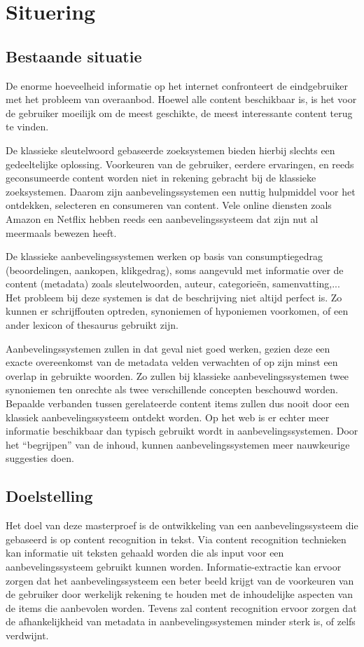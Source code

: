 \chapter{Situering}

\section{Bestaande situatie}
De enorme hoeveelheid informatie op het internet confronteert de eindgebruiker met het probleem van overaanbod.
Hoewel alle content beschikbaar is, is het voor de gebruiker moeilijk om de meest geschikte, de meest interessante
content terug te vinden. 

De klassieke sleutelwoord gebaseerde zoeksystemen bieden hierbij slechts een gedeeltelijke
oplossing. Voorkeuren van de gebruiker, eerdere ervaringen, en reeds geconsumeerde content worden niet in
rekening gebracht bij de klassieke zoeksystemen. Daarom zijn aanbevelingssystemen een nuttig hulpmiddel voor het
ontdekken, selecteren en consumeren van content. Vele online diensten zoals Amazon \cite{Everything2012} en Netflix \cite{Bennett2007} hebben
reeds een aanbevelingssysteem dat zijn nut al meermaals bewezen heeft. 

De klassieke aanbevelingssystemen werken op basis van consumptiegedrag (beoordelingen, aankopen, klikgedrag),
soms aangevuld met informatie over de content (metadata) zoals sleutelwoorden, auteur, categorie\"en, samenvatting,... Het probleem bij deze systemen is dat de beschrijving niet altijd perfect is. Zo kunnen er schrijffouten optreden, synoniemen of hyponiemen voorkomen, of een ander lexicon of thesaurus gebruikt zijn.

Aanbevelingssystemen zullen in dat geval niet goed werken, gezien deze een exacte overeenkomst van de metadata
velden verwachten of op zijn minst een overlap in gebruikte woorden. Zo zullen bij klassieke aanbevelingssystemen
twee synoniemen ten onrechte als twee verschillende concepten beschouwd worden. Bepaalde verbanden tussen
gerelateerde content items zullen dus nooit door een klassiek aanbevelingssysteem ontdekt worden.
Op het web is er echter meer informatie beschikbaar dan typisch gebruikt wordt in aanbevelingssystemen. Door het
“begrijpen” van de inhoud, kunnen aanbevelingssystemen meer nauwkeurige suggesties doen.

\section{Doelstelling}
Het doel van deze masterproef is de ontwikkeling van een aanbevelingssysteem die gebaseerd is op content
recognition in tekst. Via content recognition technieken kan informatie uit teksten gehaald worden die als input voor
een aanbevelingssysteem gebruikt kunnen worden. Informatie-extractie kan ervoor zorgen dat het
aanbevelingssysteem een beter beeld krijgt van de voorkeuren van de gebruiker door werkelijk rekening te houden
met de inhoudelijke aspecten van de items die aanbevolen worden. Tevens zal content recognition ervoor zorgen dat
de afhankelijkheid van metadata in aanbevelingssystemen minder sterk is, of zelfs verdwijnt.